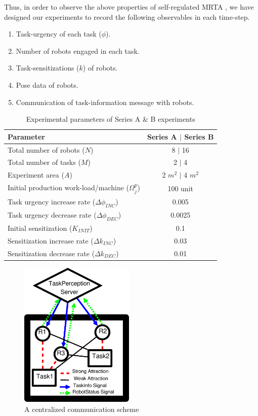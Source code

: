 \documentclass[final,5p,times,twocolumn]{elsarticle}
\begin{document}
Thus, in order to observe the above properties of self-regulated MRTA , we have designed our experiments to record the following  observables in each time-step.
\begin{enumerate}
\item Task-urgency of each task ($\phi$).
\item Number of robots engaged in each task.
\item Task-sensitizations ($k$) of robots.
\item Pose data of robots.
\item Communication of task-information message with robots.  
\end{enumerate}
\begin{table}
\caption{Experimental parameters of Series A \& B experiments}
\label{table:params}
\begin{center}
\begin{tabular}{|p{2in}|c|}
\hline Parameter & Series A $\mid$ Series B\\
\hline Total number of robots ($N$) & \hspace*{0.1cm} 8 $\mid$ 16\\
\hline Total number of tasks ($M$) & 2 $\mid$ 4\\
\hline Experiment area ($A$) & 2 $m^2$ $\mid$  4 $m^2$\\
\hline Initial production work-load/machine ($\Omega_{j}^{p}$) & 100 unit \\
\hline Task urgency increase rate ($\Delta\phi_{INC}$) & 0.005\\
\hline Task urgency decrease rate ($\Delta\phi_{DEC}$) & 0.0025\\
\hline Initial sensitization ($K_{INIT}$) & 0.1\\
\hline Sensitization increase rate ($\Delta k_{INC}$) & 0.03\\
\hline Sensitization decrease rate ($\Delta k_{DEC}$) & 0.01\\
\hline
\end{tabular}
\end{center}
\end{table}
\begin{figure}
\centering
\includegraphics[height=7cm, angle=0]{./images/CentralizedComm.eps}
\caption{\small A centralized communication scheme} %
\label{fig:ccm} %
\end{figure}
\end{document}
